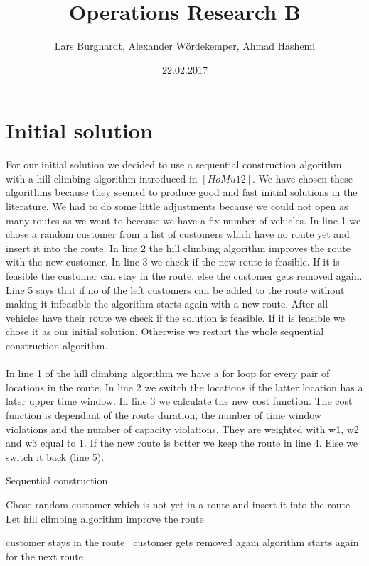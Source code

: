 \documentclass[fleqn]{scrartcl}
\title{Operations Research B}
\author{Lars Burghardt, Alexander Wördekemper, Ahmad Hashemi}
\date{22.02.2017}
\begin{document}
\maketitle
\tableofcontents
\section{Initial solution}

For our initial solution we decided to use a sequential construction algorithm with a hill climbing algorithm introduced in $[HoMu 12]$. We have chosen these algorithms because they seemed to produce good and fast initial solutions in the literature. We had to do some little adjustments because we could not open as many routes as we want to because we have a fix number of vehicles. In line 1 we chose a random customer from a list of customers which have no route yet and insert it into the route. In line 2 the hill climbing algorithm improves the route with the new customer. In line 3 we check if the new route is feasible. If it is feasible the customer can stay in the route, else the customer gets removed again. Line 5 says that if no of the left customers can be added to the route without making it infeasible the algorithm starts again with a new route. After all vehicles have their route we check if the solution is feasible. If it is feasible we chose it as our initial solution. Otherwise we restart the whole sequential construction algorithm.
\\
\\  
In line 1 of the hill climbing algorithm we have a for loop for every pair of locations in the route. In line 2 we switch the locations if the latter location has a later upper time window.
In line 3 we calculate the new cost function. The cost function is dependant of the route duration, the number of time window violations and the number of capacity violations. They are weighted with w1, w2 and w3 equal to 1. If the new route is better we keep the route in line 4. Else we switch it back (line 5).

\begin{algorithm}
\caption{Sequential construction}\label{euclid}
\begin{algorithmic}[1]

\State Chose random customer which is not yet in a route and insert it into the route
\State Let hill climbing algorithm improve the route

 customer stays in the route \Else ~customer gets removed again
\EndIf
{} algorithm starts again for the next route
\EndIf
\end{algorithmic}
\end{algorithm}
\end{document}
